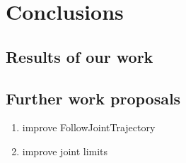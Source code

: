 \documentclass[buriama8_dp.tex]{subfiles}
\begin{document}
\chapter{Conclusions}

\section{Results of our work}
\label{sec:label}


\section{Further work proposals}
\label{sec:label}

\begin{enumerate}
\item improve FollowJointTrajectory
\item improve joint limits
\end{enumerate}
\end{document}
